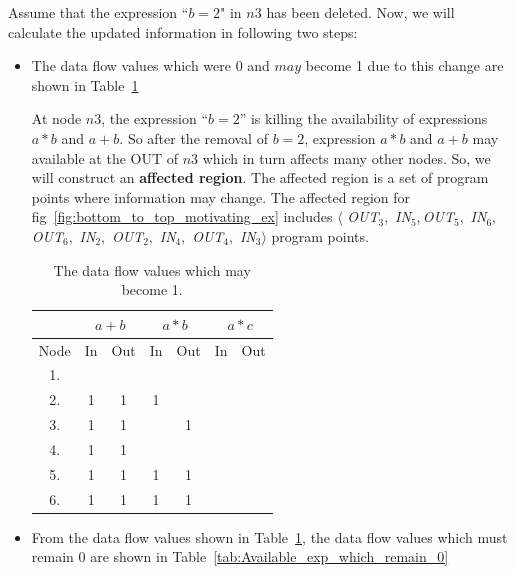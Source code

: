 \documentclass[11pt,a4paper,openright]{report}
\begin{document}
Assume that the expression ``$b=2$" in $n3$ has been deleted. Now, we will calculate the updated information in following two steps:
\begin{itemize}
\item{The data flow values which were 0 and $may$ become 1 due to this change are shown in Table~\ref{tab:Available_exp_which_may_1}}

At node $n3$, the expression ``$b=2$'' is killing the availability of expressions $a*b$ and $a+b$. So after the removal of $b=2$, 
expression $a*b$ and $a+b$ may available at the OUT of $n3$ which in turn affects many other nodes. So, we will construct an \textbf{affected region}.  
The affected region is a set of program points where information may change. The affected region for fig~\ref{fig:bottom_to_top_motivating_ex} includes $\langle$ \textit{OUT}$_3,$ \textit{IN}$_5 ,$\textit{OUT}$_5,$
\textit{IN}$_6,$ \textit{OUT}$_6,$ \textit{IN}$_2 ,$ \textit{OUT}$_2,$ \textit{IN}$_4,$ \textit{OUT}$_4,$ \textit{IN}$_3 \rangle$ 
program points.


\begin{table}[H]
  \begin{center}
    \begin{tabular}{c c c c c c c }
    \hline
       & \multicolumn{2}{c}{$a+b$} & \multicolumn{2}{c}{$a*b$} & \multicolumn{2}{c}{$a*c$} \\
    \hline
      Node & In & Out & In & Out & In & Out\\
   	\midrule
   	  1. &  &  &  &  &  &  \\
   	  2. & 1 & 1 & 1 &  &  &  \\
   	  3. & 1 & 1 &  & 1 &  &  \\
   	  4. & 1 & 1 &  &  &  &  \\
   	  5. & 1 & 1 & 1 & 1 &  &  \\
   	  6. & 1 & 1 & 1 & 1 &  & \\
      
      \bottomrule 
    \end{tabular}
    \caption{The data flow values which may become 1.}
      \label{tab:Available_exp_which_may_1}
  \end{center}
\end{table}

\item{From the data flow values shown in Table~\ref{tab:Available_exp_which_may_1}, the data flow values which must remain 0 are shown in 
Table~\ref{tab:Available_exp_which_remain_0}}


\end{itemize}
\end{document}
